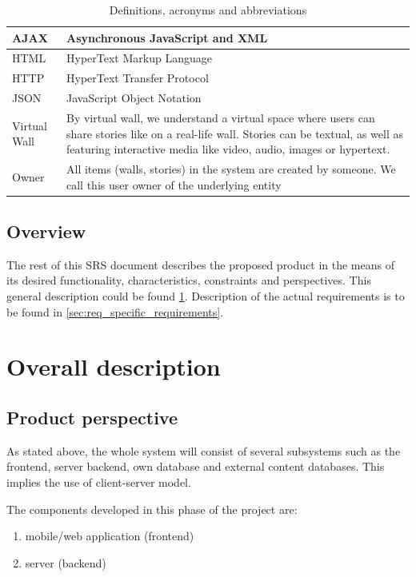 \documentclass[11pt]{book}
\begin{document}
\begin{table}[H]
\centering
\begin{tabular}{ l  p{11cm} }
	AJAX 			& Asynchronous JavaScript and XML 																					\\ \hline
	HTML 			& HyperText Markup Language 																						\\ \hline
	HTTP 			& HyperText Transfer Protocol 																						\\ \hline
	JSON 			& JavaScript Object Notation 																						\\ \hline
	Virtual Wall 	& By virtual wall, we understand a virtual space where users can share stories like on a real-life wall. 
						Stories can be textual, as well as featuring interactive media like video, audio, images or hypertext. 			\\ \hline
	Owner 			& All items (walls, stories) in the system are created by someone. We call this user owner of the underlying entity \\
\end{tabular}
\label{tab:req_definitions}
\caption{Definitions, acronyms and abbreviations}
\end{table}

\subsection{Overview}
The rest of this SRS document describes the proposed product in the means of its desired functionality, characteristics, constraints and perspectives. This general description could be found \ref{sec:req_overall_description}. Description of the actual requirements is to be found in \ref{sec:req_specific_requirements}.

\section{Overall description}\label{sec:req_overall_description}
\subsection{Product perspective}
As stated above, the whole system will consist of several subsystems such as the frontend, server backend, own database and external content databases. This implies the use of client-server model.

The components developed in this phase of the project are:

\begin{enumerate}
  \item mobile/web application (frontend)
  \item server (backend)
\end{enumerate}
\end{document}
